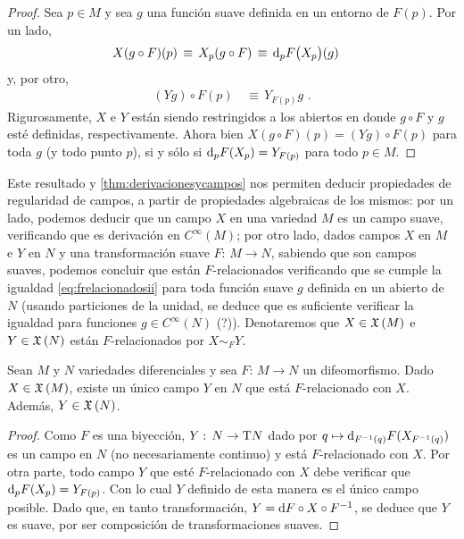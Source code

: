 \begin{proof}
	Sea $p\in M$ y sea $g$ una funci\'{o}n suave definida en un entorno
	de $F(p)$. Por un lado,
	\begin{align*}
		X(g\circ F) (p) & \,\equiv\, X_{p}(g\circ F) \,\equiv\,
			\diferencial[p]{F}\big(X_{p}\big)(g)
	\end{align*}
	y, por otro,
	\begin{align*}
		(Yg)\circ F(p) & \,\equiv\, Y_{F(p)}g
		\text{ .}
	\end{align*}
	Rigurosamente, $X$ e $Y$ est\'{a}n siendo restringidos a los
	abiertos en donde $g\circ F$ y $g$ est\'{e} definidas,
	respectivamente. Ahora bien $X(g\circ F)(p)=(Yg)\circ F(p)$
	para toda $g$ (y todo punto $p$), si y s\'{o}lo si
	$\diferencial[p]{F}(X_{p})=Y_{F(p)}$ para todo $p\in M$.
\end{proof}

\begin{obsFRelacionados}\label{obs:frelacionados}
	Este resultado y \ref{thm:derivacionesycampos} nos permiten deducir
	propiedades de regularidad de campos, a partir de propiedades
	algebraicas de los mismos: por un lado, podemos deducir
	que un campo $X$ en una variedad $M$ es un campo suave, verificando
	que es derivaci\'{o}n en $C^{\infty}(M)$; por otro lado, dados
	campos $X$ en $M$ e $Y$ en $N$ y una transformaci\'{o}n suave
	$F:\,M\rightarrow N$, sabiendo que son campos suaves, podemos
	concluir que est\'{a}n $F$-relacionados verificando que se
	cumple la igualdad \eqref{eq:frelacionadosii} para toda
	funci\'{o}n suave $g$ definida en un abierto de $N$ (usando
	particiones de la unidad, se deduce que es suficiente verificar la
	igualdad para funciones $g\in C^{\infty}(N)$ (?)).
	Denotaremos que $X\in\mathfrak{X}\left(M\right)$ e $Y\in\mathfrak{X}\left(N\right)$ est\'{a}n
	$F$-relacionados por $X\sim_{F}Y$.
\end{obsFRelacionados}

\begin{teoPushforwardDifeo}\label{thm:pushforwarddifeo}
	Sean $M$ y $N$ variedades diferenciales y sea $F:\,M\rightarrow N$
	un difeomorfismo. Dado $X\in\mathfrak{X}\left(M\right)$, existe un \'{u}nico
	campo $Y$ en $N$ que est\'{a} $F$-relacionado con $X$. Adem\'{a}s,
	$Y\in\mathfrak{X}\left(N\right)$.
\end{teoPushforwardDifeo}

\begin{proof}
	Como $F$ es una biyecci\'{o}n, $Y:\,N\rightarrow\tangente{N}$
	dado por $q\mapsto \diferencial[F^{-1}(q)]{F}(X_{F^{-1}(q)})$ es
	un campo en $N$ (no necesariamente continuo) y est\'{a}
	$F$-relacionado con $X$. Por otra parte, todo campo $Y$ que
	est\'{e} $F$-relacionado con $X$ debe verificar que
	$\diferencial[p]{F}(X_{p})=Y_{F(p)}$. Con lo cual $Y$ definido
	de esta manera es el \'{u}nico campo posible.
	Dado que, en tanto transformaci\'{o}n,
	$Y=\diferencial{F}\circ X\circ F^{-1}$, se deduce que $Y$ es
	suave, por ser composici\'{o}n de transformaciones suaves.
\end{proof}

